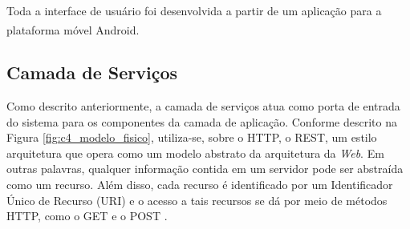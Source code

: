 Toda a interface de usuário foi desenvolvida a partir de um aplicação para a plataforma móvel Android\textsuperscript{\textregistered}.




\subsection{Camada de Serviços}

Como descrito anteriormente, a camada de serviços atua como porta de entrada do sistema para os componentes da camada de aplicação. 
Conforme descrito na Figura \ref{fig:c4_modelo_fisico}, utiliza-se, sobre o HTTP, o REST, um estilo arquitetura que opera como um modelo abstrato da arquitetura da \textit{Web}. Em outras palavras, qualquer informação contida em um servidor pode ser abstraída como um recurso. Além disso, cada recurso é identificado por um Identificador Único de Recurso (URI) e o acesso a tais recursos se dá por meio de métodos HTTP, como o GET e o POST \cite{Fielding2000}.

